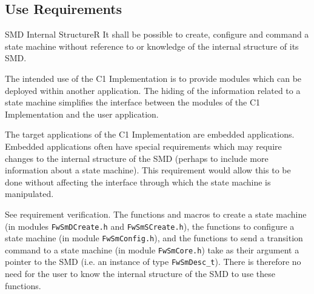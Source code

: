 \documentclass[requirements]{../fwprofile}
\begin{document}
\subsection{Use Requirements}\label{req:userReqsSMD}

\begin{fw_req}{SMD Internal Structure}{R}
{It shall be possible to create, configure and command a state
 machine without reference to or knowledge of the internal structure of its SMD.}
{The intended use of the C1 Implementation is to provide modules 
which can be deployed within another application. 
The hiding of the information related to a state machine simplifies the interface between 
the modules of the C1 Implementation and the user application.

The target applications of the C1 Implementation are embedded applications. 
Embedded applications often have special requirements which may require changes to the internal 
structure of the SMD (perhaps to include more information about a state machine). 
This requirement would allow this to be done without affecting the interface through which 
the state machine is manipulated.} 
{See requirement verification.} 
{The functions and macros to create a state machine 
(in modules \texttt{FwSmDCreate.h} and \texttt{FwSmSCreate.h}), 
the functions to configure a state machine (in module \texttt{FwSmConfig.h}), and the 
functions to send a transition command to a state machine (in module \texttt{FwSmCore.h}) 
take as their argument a pointer to the SMD (i.e. an instance of type \texttt{FwSmDesc\_t}). 
There is therefore no need for the user to know the internal structure of the SMD to use these functions.}
\end{fw_req}
\end{document}
